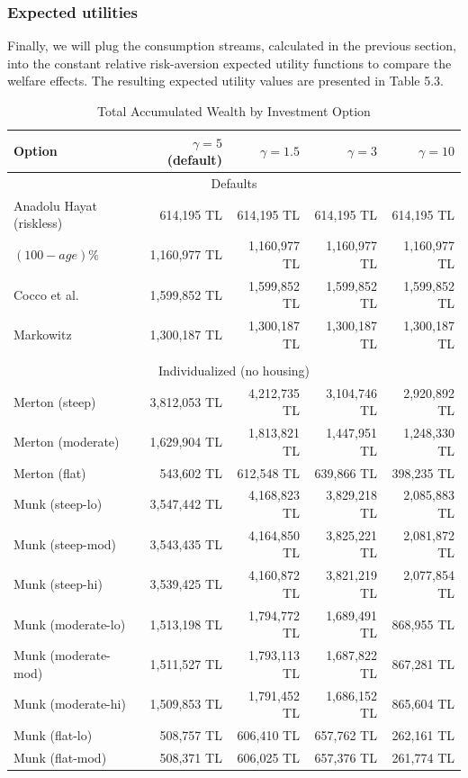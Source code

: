 \documentclass[]{elsarticle}
\begin{document}
\subsubsection{Expected utilities}
Finally, we will plug the consumption streams, calculated in the previous section, into the constant relative risk-aversion expected utility functions to compare the welfare effects. The resulting expected utility values are presented in Table 5.3.


\begin{table}%
	\centering
	\caption{Total Accumulated Wealth by Investment Option}
	\begin{tabular}[c]{lrrrr}
		\hline
		Option&$\gamma=5$ (default) & $\gamma=1.5$ & $\gamma=3$ & $\gamma=10$\\
		\hline
		\multicolumn{5}{c}{Defaults}\\
Anadolu Hayat (riskless)&614,195 TL&614,195 TL&614,195 TL&614,195 TL\\
$(100-age)\%$&1,160,977 TL&1,160,977 TL&1,160,977 TL&1,160,977 TL\\
Cocco et al.&1,599,852 TL&1,599,852 TL&1,599,852 TL&1,599,852 TL\\
Markowitz&1,300,187 TL&1,300,187 TL&1,300,187 TL&1,300,187 TL\\
\multicolumn{5}{c}{}\\
\multicolumn{5}{c}{Individualized (no housing)}\\
Merton (steep)&3,812,053 TL&4,212,735 TL&3,104,746 TL&2,920,892 TL\\
Merton (moderate)&1,629,904 TL&1,813,821 TL&1,447,951 TL&1,248,330 TL\\
Merton (flat)&543,602 TL&612,548 TL&639,866 TL&398,235 TL\\
Munk (steep-lo)&3,547,442 TL&4,168,823 TL&3,829,218 TL&2,085,883 TL\\
Munk (steep-mod)&3,543,435 TL&4,164,850 TL&3,825,221 TL&2,081,872 TL\\
Munk (steep-hi)&3,539,425 TL&4,160,872 TL&3,821,219 TL&2,077,854 TL\\
Munk (moderate-lo)&1,513,198 TL&1,794,772 TL&1,689,491 TL&868,955 TL\\
Munk (moderate-mod)&1,511,527 TL&1,793,113 TL&1,687,822 TL&867,281 TL\\
Munk (moderate-hi)&1,509,853 TL&1,791,452 TL&1,686,152 TL&865,604 TL\\
Munk (flat-lo)&508,757 TL&606,410 TL&657,762 TL&262,161 TL\\
Munk (flat-mod)&508,371 TL&606,025 TL&657,376 TL&261,774 TL\\

\end{tabular}
\end{table}
\end{document}
